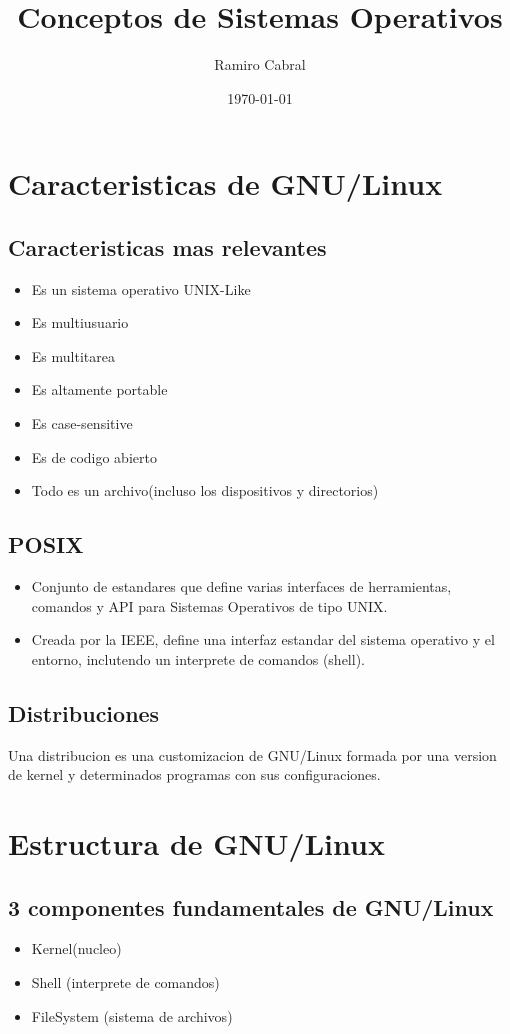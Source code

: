 \documentclass[11pt]{article}
\title{\Huge{Conceptos de Sistemas Operativos\\ }}
\author{\huge{Ramiro Cabral}}
\date{\today}
\begin{document}
\maketitle
\pagebreak
\section{Caracteristicas de GNU/Linux}

\subsection{Caracteristicas mas relevantes}
\begin{itemize}
    \item Es un sistema operativo UNIX-Like
    \item Es multiusuario
    \item Es multitarea
    \item Es altamente portable
    \item Es case-sensitive
    \item Es de codigo abierto
    \item Todo es un archivo(incluso los dispositivos y directorios)
\end{itemize}
\subsection{POSIX}
\begin{itemize}
    \item Conjunto de estandares que define varias interfaces de herramientas, comandos y API para Sistemas Operativos de tipo UNIX.
    \item Creada por la IEEE, define una interfaz estandar del sistema operativo y el entorno, inclutendo un interprete de comandos (shell).
\end{itemize}

\subsection{Distribuciones}
Una distribucion es una customizacion de GNU/Linux
formada por una version de kernel y determinados programas
con sus configuraciones.

\section{Estructura de GNU/Linux}
\subsection{3 componentes fundamentales de GNU/Linux}
\begin{itemize}
    \item Kernel(nucleo)
    \item Shell (interprete de comandos)
    \item FileSystem (sistema de archivos)
\end{itemize}
\end{document}
